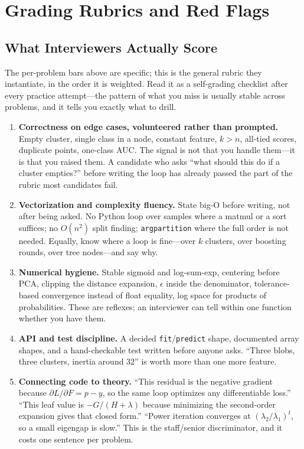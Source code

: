 \section{Grading Rubrics and Red Flags}
\label{cml:sec:canon_rubrics}

\subsection{What Interviewers Actually Score}

The per-problem bars above are specific; this is the general rubric they instantiate, in the order it is weighted. Read it as a self-grading checklist after every practice attempt---the pattern of what you miss is usually stable across problems, and it tells you exactly what to drill.

\begin{enumerate}
    \item \textbf{Correctness on edge cases, volunteered rather than prompted.} Empty cluster, single class in a node, constant feature, $k > n$, all-tied scores, duplicate points, one-class AUC. The signal is not that you handle them---it is that you raised them. A candidate who asks ``what should this do if a cluster empties?'' before writing the loop has already passed the part of the rubric most candidates fail.
    \item \textbf{Vectorization and complexity fluency.} State big-O before writing, not after being asked. No Python loop over samples where a matmul or a sort suffices; no $O(n^2)$ split finding; \texttt{argpartition} where the full order is not needed. Equally, know where a loop is fine---over $k$ clusters, over boosting rounds, over tree nodes---and say why.
    \item \textbf{Numerical hygiene.} Stable sigmoid and log-sum-exp, centering before PCA, clipping the distance expansion, $\epsilon$ inside the denominator, tolerance-based convergence instead of float equality, log space for products of probabilities. These are reflexes; an interviewer can tell within one function whether you have them.
    \item \textbf{API and test discipline.} A decided \texttt{fit}/\texttt{predict} shape, documented array shapes, and a hand-checkable test written before anyone asks. ``Three blobs, three clusters, inertia around 32'' is worth more than one more feature.
    \item \textbf{Connecting code to theory.} ``This residual is the negative gradient because $\partial L/\partial F = p - y$, so the same loop optimizes any differentiable loss.'' ``This leaf value is $-G/(H+\lambda)$ because minimizing the second-order expansion gives that closed form.'' ``Power iteration converges at $(\lambda_2/\lambda_1)^t$, so a small eigengap is slow.'' This is the staff/senior discriminator, and it costs one sentence per problem.
\end{enumerate}

